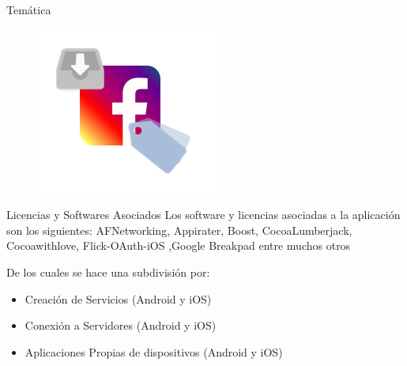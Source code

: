 
\begin{frame}[t,plain]
\titlepage
\end{frame}

\begin{frame}[t]{Temática}

\begin{figure}[!h]
    \centering
    \includegraphics[scale=1.35]{fbig.png}
    \label{fig:my_label}
\end{figure}

\end{frame}






\begin{frame}[t,fragile]{Licencias y Softwares Asociados}
Los software y licencias asociadas a la aplicación son los siguientes:
AFNetworking, Appirater, Boost, CocoaLumberjack, Cocoawithlove, Flick-OAuth-iOS
    ,Google Breakpad entre muchos otros
\bigskip


De los cuales se hace una subdivisión por:

\begin{itemize}
    \item Creación de Servicios (Android y iOS)
    \item Conexión a Servidores (Android y iOS)
    \item Aplicaciones Propias de dispositivos (Android y iOS)
\end{itemize}



\end{frame}


